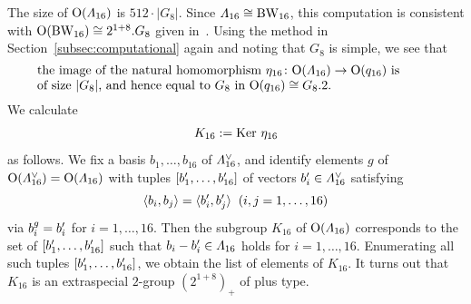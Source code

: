 \documentclass{amsart} %
\begin{document}
%
%
%
 The size of $\mathord{\mathrm{O}}(\varLambda_{16})$ is $512\cdot |G_8|$.
 Since $\varLambda_{16}\cong \mathrm{BW}_{16}$, 
this computation is consistent with $\mathord{\mathrm{O}}(\mathrm{BW}_{16})\cong 2^{1+8}.G_8$
given in~\cite[Chapter 4, Section 10]{theCSbook}.
Using the method in Section~\ref{subsec:computational} again
and noting that $G_8$ is simple,
we see that 
%
\begin{equation}\label{eq:Imageeta16}
\parbox{11cm}{
\textrm{%
the image of 
the natural homomorphism $\eta_{16}\colon \OG(\Lamsxtn)\to \OG(q_{16})$  is \\
 of size $|G_8|$, and hence 
equal to $G_8$ in $\OG(q_{16})\cong G_8.2$.
}
}
\end{equation}
%
%
We calculate
\[
K_{16}:=\operatorname{Ker} \,\eta_{16}
\]
as follows.
We fix a basis 
$b_1, \dots, b_{16}$ of $\varLambda_{16}^{\vee}$, 
and identify elements $g$ of $\mathord{\mathrm{O}}( \varLambda_{16}^{\vee})=\mathord{\mathrm{O}}( \varLambda_{16})$
with tuples $[b_1^{\prime}, \dots, b_{16}^{\prime}]$ of vectors 
$b_i^{\prime}\in \varLambda_{16}^{\vee}$
satisfying
\[
\langle b_i, b_j \rangle=\langle b_i^{\prime}, b_j^{\prime} \rangle \;\;(i, j=1, \dots, 16)
\]
via $b_i^g=b_i^{\prime}$ for $i=1, \dots, 16$.
Then 
the subgroup
$K_{16}$ of $\mathord{\mathrm{O}}( \varLambda_{16})$
corresponds to the set of 
$[b_1^{\prime}, \dots, b_{16}^{\prime}]$
such that $b_i-b_i^{\prime}\in \varLambda_{16}$ holds for $i=1, \dots, 16$.
Enumerating all such tuples $[b_1^{\prime}, \dots, b_{16}^{\prime}]$,
we obtain the list of elements of $K_{16}$.
It turns out that 
$K_{16}$ is an extraspecial $2$-group $(2^{1+8})_{+}$ of plus type.
%
\end{document}
